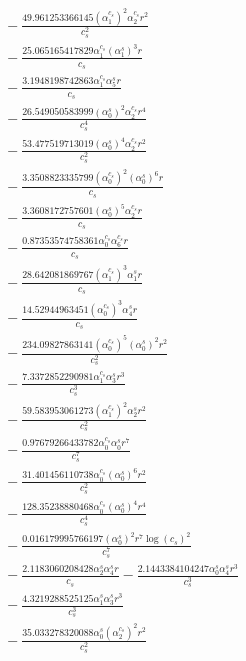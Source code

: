\documentclass[10pt]{article}
\begin{document}
\begin{align*}
&{}  - \frac{49.961253366145 \left(\alpha_{1}^{c_s}\right)^{2} \alpha_{2}^{c_s} r^{2}}{c_{s}^{2}} \\
&{}  - \frac{25.065165417829 \alpha_{1}^{c_s} \left(\alpha_{1}^s\right)^{3} r}{c_{s}} \\
&{}  - \frac{3.1948198742863 \alpha_{1}^{c_s} \alpha_{5}^s r}{c_{s}} \\
&{}  - \frac{26.549050583999 \left(\alpha_{0}^s\right)^{2} \alpha_{2}^{c_s} r^{4}}{c_{s}^{4}} \\
&{}  - \frac{53.477519713019 \left(\alpha_{0}^s\right)^{4} \alpha_{2}^{c_s} r^{2}}{c_{s}^{2}} \\
&{}  - \frac{3.3508823335799 \left(\alpha_{0}^{c_s}\right)^{2} \left(\alpha_{0}^s\right)^{6} r}{c_{s}} \\
&{}  - \frac{3.3608172757601 \left(\alpha_{0}^s\right)^{5} \alpha_{2}^{c_s} r}{c_{s}} \\
&{}  - \frac{0.87353574758361 \alpha_{0}^{c_s} \alpha_{6}^{c_s} r}{c_{s}} \\
&{}  - \frac{28.642081869767 \left(\alpha_{1}^{c_s}\right)^{3} \alpha_{1}^s r}{c_{s}} \\
&{}  - \frac{14.52944963451 \left(\alpha_{0}^{c_s}\right)^{3} \alpha_{4}^s r}{c_{s}} \\
&{}  - \frac{234.09827863141 \left(\alpha_{0}^{c_s}\right)^{5} \left(\alpha_{0}^s\right)^{2} r^{2}}{c_{s}^{2}} \\
&{}  - \frac{7.3372852290981 \alpha_{1}^{c_s} \alpha_{3}^s r^{3}}{c_{s}^{3}} \\
&{}  - \frac{59.583953061273 \left(\alpha_{1}^{c_s}\right)^{2} \alpha_{2}^s r^{2}}{c_{s}^{2}} \\
&{}  - \frac{0.97679266433782 \alpha_{0}^{c_s} \alpha_{0}^s r^{7}}{c_{s}^{7}} \\
&{}  - \frac{31.401456110738 \alpha_{0}^{c_s} \left(\alpha_{0}^s\right)^{6} r^{2}}{c_{s}^{2}} \\
&{}  - \frac{128.35238880468 \alpha_{0}^{c_s} \left(\alpha_{0}^s\right)^{4} r^{4}}{c_{s}^{4}} \\
&{}  - \frac{0.016179995766197 \left(\alpha_{0}^s\right)^{2} r^{7} \log{\left(c_{s} \right)}^{2}}{c_{s}^{7}} \\
&{}  - \frac{2.1183060208428 \alpha_{2}^s \alpha_{4}^s r}{c_{s}} - \frac{2.1443384104247 \alpha_{0}^s \alpha_{4}^s r^{3}}{c_{s}^{3}} \\
&{}  - \frac{4.3219288525125 \alpha_{1}^s \alpha_{3}^s r^{3}}{c_{s}^{3}} \\
&{}  - \frac{35.033278320088 \alpha_{0}^s \left(\alpha_{2}^{c_s}\right)^{2} r^{2}}{c_{s}^{2}} \\

\end{align*}
\end{document}
